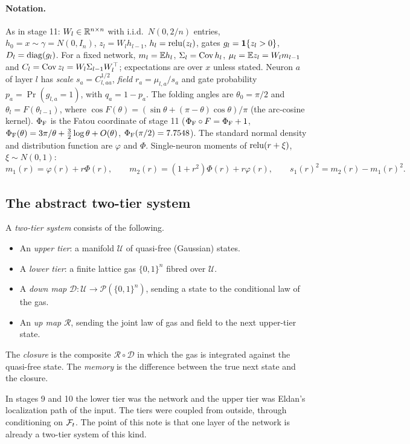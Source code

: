 \label{sec:cycle}
\paragraph{Notation.} As in stage 11: $W_l\in\mathbb R^{n\times n}$ with i.i.d.\ $N(0,2/n)$ entries, $h_0=x\sim\gamma=N(0,I_n)$, $z_l=W_lh_{l-1}$,
$h_l=\operatorname{relu}(z_l)$, gates $g_l=\mathbf 1\{z_l>0\}$, $D_l=\operatorname{diag}(g_l)$. For a fixed network, $m_l=\mathbb E h_l$, $\Sigma_l=\operatorname{Cov} h_l$, $\mu_l=\mathbb E z_l=W_lm_{l-1}$
and $C_l=\operatorname{Cov} z_l=W_l\Sigma_{l-1}W_l^{\top}$; expectations are over $x$ unless stated. Neuron $a$ of layer $l$ has \emph{scale}
$s_a=C_{l,aa}^{1/2}$, \emph{field} $r_a=\mu_{l,a}/s_a$ and gate probability $p_a=\Pr(g_{l,a}=1)$, with $q_a=1-p_a$. The folding angles
are $\theta_0=\pi/2$ and $\theta_l=F(\theta_{l-1})$, where $\cos F(\theta)=(\sin\theta+(\pi-\theta)\cos\theta)/\pi$ (the arc-cosine kernel).
$\Phi_{\mathrm F}$ is the Fatou coordinate of stage 11 ($\Phi_{\mathrm F}\circ F=\Phi_{\mathrm F}+1$, $\Phi_{\mathrm F}(\theta)=3\pi/\theta+\frac32\log\theta+O(\theta)$, $\Phi_{\mathrm F}(\pi/2)=7.7548$).
The standard normal density and distribution function are $\varphi$ and $\Phi$. Single-neuron moments of $\operatorname{relu}(r+\xi)$, $\xi\sim N(0,1)$:
\[
m_1(r)=\varphi(r)+r\Phi(r),\qquad m_2(r)=(1+r^2)\Phi(r)+r\varphi(r),\qquad s_1(r)^2=m_2(r)-m_1(r)^2 .
\]

\subsection{The abstract two-tier system}
\begin{definition}\label{def:twotier}
A \emph{two-tier system} consists of the following.
\begin{itemize}[leftmargin=*]
\item An \emph{upper tier}: a manifold $\mathcal U$ of quasi-free (Gaussian) states.
\item A \emph{lower tier}: a finite lattice gas $\{0,1\}^n$ fibred over $\mathcal U$.
\item A \emph{down map} $\mathcal D:\mathcal U\to\mathcal P(\{0,1\}^n)$, sending a state to the conditional law of the gas.
\item An \emph{up map} $\mathcal R$, sending the joint law of gas and field to the next upper-tier state.
\end{itemize}
The \emph{closure} is the composite $\mathcal R\circ\mathcal D$ in which the gas is integrated against the quasi-free state. The
\emph{memory} is the difference between the true next state and the closure.
\end{definition}
In stages 9 and 10 the lower tier was the network and the upper tier was Eldan's localization path of the input. The tiers were
coupled from outside, through conditioning on $\mathcal F_t$. The point of this note is that one layer of the network is already a
two-tier system of this kind.

